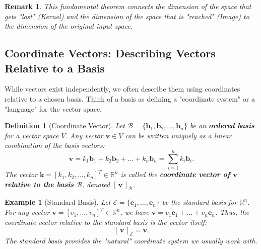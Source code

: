 \documentclass[11pt, a4paper]{article}
\theoremstyle{mytheoremstyle}
\theoremstyle{mydefstyle}
\newtheorem{definition}[theorem]{Definition}
\newtheorem{example}[theorem]{Example}
\newtheorem{remark}[theorem]{Remark}
\newcommand{\R}{\mathbb{R}}      %
\newcommand{\B}{\mathcal{B}}    %
\newcommand{\E}{\mathcal{E}}    %
\newcommand{\vb}{\mathbf{v}}     %
\newcommand{\eb}{\mathbf{e}}     %
\newcommand{\bb}{\mathbf{b}}     %
\newcommand{\kb}{\mathbf{k}}     %
\newcommand{\coord}[2]{[\,#1\,]_{\mathcal{#2}}} %
\begin{document}
\begin{remark}
This fundamental theorem connects the dimension of the space that gets "lost" (Kernel) and the dimension of the space that is "reached" (Image) to the dimension of the original input space.
\end{remark}


\subsection{Coordinate Vectors: Describing Vectors Relative to a Basis}

While vectors exist independently, we often describe them using coordinates relative to a chosen basis. Think of a basis as defining a "coordinate system" or a "language" for the vector space.

\begin{definition}[Coordinate Vector]
Let $\B = \{\bb_1, \bb_2, \dots, \bb_n\}$ be an \textbf{ordered basis} for a vector space $V$. Any vector $\vb \in V$ can be written \emph{uniquely} as a linear combination of the basis vectors:
\[ \vb = k_1 \bb_1 + k_2 \bb_2 + \dots + k_n \bb_n = \sum_{i=1}^n k_i \bb_i. \]
The vector $\kb = [k_1, k_2, \dots, k_n]^T \in \R^n$ is called the \textbf{coordinate vector of $\vb$ relative to the basis $\B$}, denoted $\coord{\vb}{B}$.
\end{definition}

\begin{example}[Standard Basis]
Let $\E = \{\eb_1, \dots, \eb_n\}$ be the standard basis for $\R^n$. For any vector $\vb = [v_1, \dots, v_n]^T \in \R^n$, we have $\vb = v_1 \eb_1 + \dots + v_n \eb_n$. Thus, the coordinate vector relative to the standard basis is the vector itself:
\[ \coord{\vb}{E} = \vb. \]
The standard basis provides the "natural" coordinate system we usually work with.
\end{example}
\end{document}
